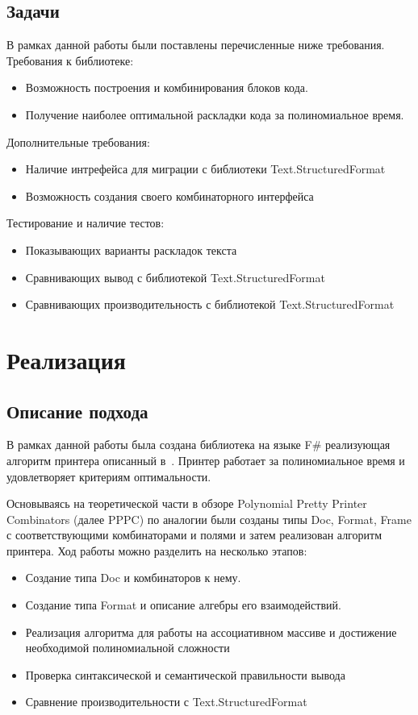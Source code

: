 \documentclass{matmex-diploma}
\begin{document}
\subsection{Задачи }
В рамках данной работы были поставлены перечисленные ниже требования.
Требования к библиотеке:
\begin{itemize}
    \item Возможность построения и комбинирования блоков кода.
    \item Получение наиболее оптимальной раскладки кода за полиномиальное время.
\end{itemize}
Дополнительные требования:
\begin{itemize}
    \item Наличие интрефейса для миграции с библиотеки Text.StructuredFormat
    \item Возможность создания своего комбинаторного интерфейса
\end{itemize} 
Тестирование и наличие тестов:
\begin{itemize}
    \item Показывающих варианты раскладок текста
    \item Сравнивающих вывод с библиотекой Text.StructuredFormat
    \item Сравнивающих производительность с библиотекой Text.StructuredFormat
\end{itemize} 
\section{Реализация}
\subsection{Описание подхода}
В рамках данной работы была создана библиотека на языке F\# реализующая алгоритм принтера описанный в~\cite{podkopaevD}. Принтер работает за полиномиальное время и удовлетворяет критериям оптимальности.

Основываясь на теоретической части в обзоре Polynomial Pretty Printer Combinators (далее PPPC) по аналогии были созданы типы Doc, Format, Frame с соответствующими комбинаторами и полями и затем реализован алгоритм принтера. 
Ход работы можно разделить на несколько этапов:
\begin{itemize}
    \item Создание типа Doc и комбинаторов к нему.
    \item Создание типа Format и описание алгебры его взаимодействий.
    \item Реализация алгоритма для работы на ассоциативном массиве и достижение необходимой полиномиальной сложности
    \item Проверка синтаксической и семантической правильности вывода
    \item Сравнение производительности с Text.StructuredFormat
\end{itemize}
\end{document}

